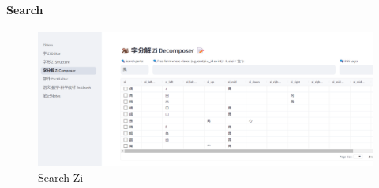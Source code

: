 \documentclass[
  11pt,
  letterpaper,
]{article}
\begin{document}
\hypertarget{search}{%
\paragraph{Search}\label{search}}

\begin{figure}
\centering
\includegraphics{./images/app_discover-zi-by-part.png}
\caption{Search Zi}
\end{figure}
\end{document}
